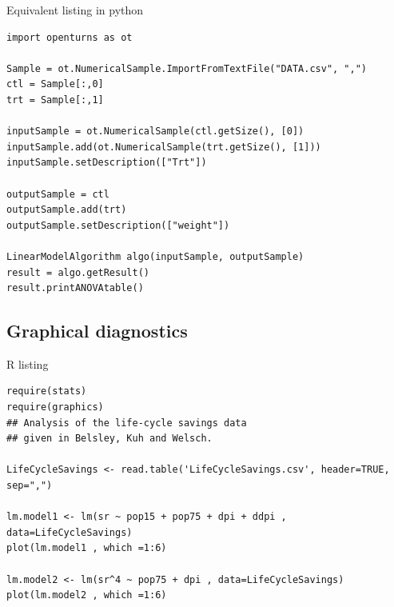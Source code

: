 Equivalent listing in python
\begin{lstlisting}[style=pythonStyle]
import openturns as ot

Sample = ot.NumericalSample.ImportFromTextFile("DATA.csv", ",")
ctl = Sample[:,0]
trt = Sample[:,1]

inputSample = ot.NumericalSample(ctl.getSize(), [0])
inputSample.add(ot.NumericalSample(trt.getSize(), [1]))
inputSample.setDescription(["Trt"])

outputSample = ctl
outputSample.add(trt)
outputSample.setDescription(["weight"])

LinearModelAlgorithm algo(inputSample, outputSample)
result = algo.getResult()
result.printANOVAtable()
\end{lstlisting}

\subsection{Graphical diagnostics}

R listing
\begin{lstlisting}[style=RStyle]
require(stats)
require(graphics)
## Analysis of the life-cycle savings data
## given in Belsley, Kuh and Welsch.

LifeCycleSavings <- read.table('LifeCycleSavings.csv', header=TRUE, sep=",")

lm.model1 <- lm(sr ~ pop15 + pop75 + dpi + ddpi , data=LifeCycleSavings)
plot(lm.model1 , which =1:6)

lm.model2 <- lm(sr^4 ~ pop75 + dpi , data=LifeCycleSavings)
plot(lm.model2 , which =1:6)
\end{lstlisting}


